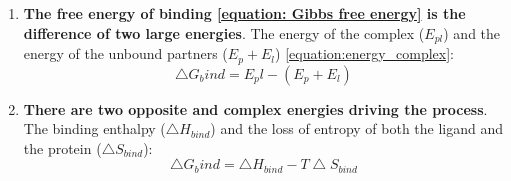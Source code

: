 \documentclass[12pt, b5paper,twoside]{tesi_upf}
\begin{document}
\begin{enumerate}
\item \textbf{The free energy of binding \ref{equation: Gibbs free energy} is the difference of two large energies}. The energy of the complex ($E_{pl}$) and the energy of the unbound partners ($E_{p} + E_{l}$) \ref{equation:energy_complex}: 
\begin{equation}\label{equation:energy_complex}
\bigtriangleup G_bind=E_pl - (E_{p} + E_{l}) 
\end{equation}
\item \textbf{There are two opposite and complex energies driving the process}. The binding enthalpy ($\bigtriangleup H_{bind}$) and the loss of entropy of both the ligand and the protein ($\bigtriangleup S_{bind}$): 
\begin{equation}\label{equation:energy_enthalpy_entropy}
\bigtriangleup G_bind= \bigtriangleup H_{bind} -  T\bigtriangleup S_{bind} 
\end{equation}


\end{enumerate}
\end{document}
